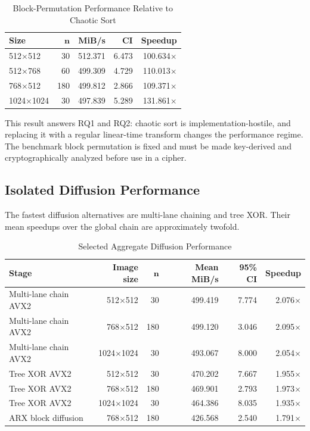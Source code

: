 \documentclass[twocolumn,runningheads]{svjour3}
\begin{document}
\begin{table}[t]
\caption{Block-Permutation Performance Relative to Chaotic Sort}
\label{tab:permutation}
\centering
\setlength{\tabcolsep}{3pt}
\begin{tabular}{lrrrr}
\toprule
\textbf{Size} & $\boldsymbol{n}$ & \textbf{MiB/s} & \textbf{CI} & \textbf{Speedup} \\
\midrule
512$\times$512 & 30 & 512.371 & 6.473 & 100.634$\times$ \\
512$\times$768 & 60 & 499.309 & 4.729 & 110.013$\times$ \\
768$\times$512 & 180 & 499.812 & 2.866 & 109.371$\times$ \\
1024$\times$1024 & 30 & 497.839 & 5.289 & 131.861$\times$ \\
\bottomrule
\end{tabular}
\end{table}

This result answers RQ1 and RQ2: chaotic sort is implementation-hostile, and
replacing it with a regular linear-time transform changes the performance
regime. The benchmark block permutation is fixed and must be made key-derived
and cryptographically analyzed before use in a cipher.

\subsection{Isolated Diffusion Performance}
The fastest diffusion alternatives are multi-lane chaining and tree XOR.
Their mean speedups over the global chain are approximately twofold.

\begin{table}[t]
\caption{Selected Aggregate Diffusion Performance}
\label{tab:diffusion}
\centering
\begin{tabular}{lrrrrr}
\toprule
\textbf{Stage} & \textbf{Image size} & $\boldsymbol{n}$ & \textbf{Mean MiB/s} & \textbf{95\% CI} & \textbf{Speedup} \\
\midrule
Multi-lane chain AVX2 & 512$\times$512 & 30 & 499.419 & 7.774 & 2.076$\times$ \\
Multi-lane chain AVX2 & 768$\times$512 & 180 & 499.120 & 3.046 & 2.095$\times$ \\
Multi-lane chain AVX2 & 1024$\times$1024 & 30 & 493.067 & 8.000 & 2.054$\times$ \\
Tree XOR AVX2 & 512$\times$512 & 30 & 470.202 & 7.667 & 1.955$\times$ \\
Tree XOR AVX2 & 768$\times$512 & 180 & 469.901 & 2.793 & 1.973$\times$ \\
Tree XOR AVX2 & 1024$\times$1024 & 30 & 464.386 & 8.035 & 1.935$\times$ \\
ARX block diffusion & 768$\times$512 & 180 & 426.568 & 2.540 & 1.791$\times$ \\
\bottomrule
\end{tabular}
\end{table}
\end{document}
